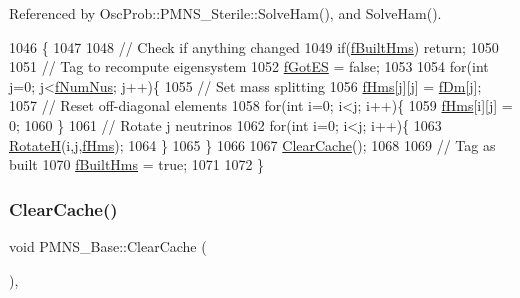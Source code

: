 Referenced by Osc\+Prob\+::\+P\+M\+N\+S\+\_\+\+Sterile\+::\+Solve\+Ham(), and Solve\+Ham().


\begin{DoxyCode}
1046 \{
1047 
1048   \textcolor{comment}{// Check if anything changed}
1049   \textcolor{keywordflow}{if}(\hyperlink{classOscProb_1_1PMNS__Base_a9ac3cadeac8db1b90f3152f476244780}{fBuiltHms}) \textcolor{keywordflow}{return};
1050   
1051   \textcolor{comment}{// Tag to recompute eigensystem}
1052   \hyperlink{classOscProb_1_1PMNS__Base_a6dc5cd010d2d70b2324745b4e53e9839}{fGotES} = \textcolor{keyword}{false};
1053 
1054   \textcolor{keywordflow}{for}(\textcolor{keywordtype}{int} j=0; j<\hyperlink{classOscProb_1_1PMNS__Base_a24bb74bed63569dfe88b18fa6a08060e}{fNumNus}; j++)\{
1055     \textcolor{comment}{// Set mass splitting}
1056     \hyperlink{classOscProb_1_1PMNS__Base_acd3c8783e7603081eab316ea4c86c766}{fHms}[j][j] = \hyperlink{classOscProb_1_1PMNS__Base_a406a31c3b5d620e5a0cace5b411f9f70}{fDm}[j];
1057     \textcolor{comment}{// Reset off-diagonal elements}
1058     \textcolor{keywordflow}{for}(\textcolor{keywordtype}{int} i=0; i<j; i++)\{
1059       \hyperlink{classOscProb_1_1PMNS__Base_acd3c8783e7603081eab316ea4c86c766}{fHms}[i][j] = 0;
1060     \}
1061     \textcolor{comment}{// Rotate j neutrinos}
1062     \textcolor{keywordflow}{for}(\textcolor{keywordtype}{int} i=0; i<j; i++)\{
1063       \hyperlink{classOscProb_1_1PMNS__Base_a6a3cf45bbe2349abf06708b65677c044}{RotateH}(i,j,\hyperlink{classOscProb_1_1PMNS__Base_acd3c8783e7603081eab316ea4c86c766}{fHms});
1064     \}
1065   \}
1066 
1067   \hyperlink{classOscProb_1_1PMNS__Base_ac47fd33e69aa6490f99e2fd147a92f03}{ClearCache}();
1068 
1069   \textcolor{comment}{// Tag as built}
1070   \hyperlink{classOscProb_1_1PMNS__Base_a9ac3cadeac8db1b90f3152f476244780}{fBuiltHms} = \textcolor{keyword}{true};
1071 
1072 \}
\end{DoxyCode}
\mbox{\label{classOscProb_1_1PMNS__Base_ac47fd33e69aa6490f99e2fd147a92f03}} 
\subsubsection{\texorpdfstring{Clear\+Cache()}{ClearCache()}}
{\footnotesize\ttfamily void P\+M\+N\+S\+\_\+\+Base\+::\+Clear\+Cache (\begin{DoxyParamCaption}{ }\end{DoxyParamCaption})\hspace{0.3cm}{\ttfamily [virtual]}, {\ttfamily [inherited]}}

